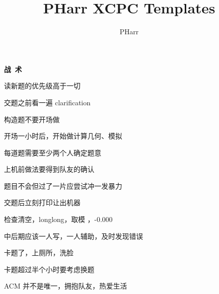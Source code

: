 \documentclass[UTF-8,12pt,twoside]{ctexbook}
\title{PHarr XCPC Templates}
\author{PHarr}
\begin{document}
    \maketitle
    \tableofcontents
    
    
    
    
    
    

    \clearpage
    \thispagestyle{empty}
    \begin{center}
        \textbf{\fontsize{26pt}{30pt}\selectfont 战\ 术}
    \end{center}

    \begin{leftbar}
        \fontsize{18pt}{22pt}\selectfont 读新题的优先级高于一切

        \fontsize{18pt}{22pt}\selectfont 交题之前看一遍 clarification

        \fontsize{18pt}{22pt}\selectfont 构造题不要开场做

        \fontsize{18pt}{22pt}\selectfont 开场一小时后，开始做计算几何、模拟

        \fontsize{18pt}{22pt}\selectfont 每道题需要至少两个人确定题意

        \fontsize{18pt}{22pt}\selectfont 上机前做法要得到队友的确认

        \fontsize{18pt}{22pt}\selectfont 题目不会但过了一片应尝试冲一发暴力

        \fontsize{18pt}{22pt}\selectfont 交题后立刻打印让出机器

        \fontsize{18pt}{22pt}\selectfont 检查清空，longlong，取模 ，-0.000

        \fontsize{18pt}{22pt}\selectfont 中后期应该一人写，一人辅助，及时发现错误

        \fontsize{18pt}{22pt}\selectfont 卡题了，上厕所，洗脸

        \fontsize{18pt}{22pt}\selectfont 卡题超过半个小时要考虑换题

        \fontsize{18pt}{22pt}\selectfont ACM 并不是唯一，拥抱队友，热爱生活
    \end{leftbar}
\end{document}
